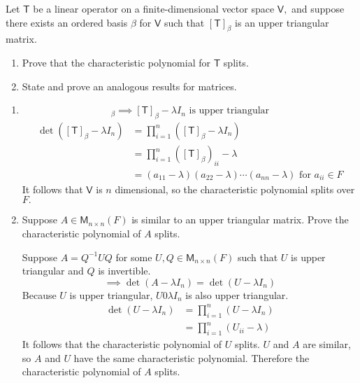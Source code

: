 Let $\mathsf{T}$ be a linear operator on a finite-dimensional vector
space $\mathsf{V},$ and suppose there exists an ordered basis $\beta$
for $\mathsf{V}$ such that $[\mathsf{T}]_\beta$ is an upper triangular
matrix.
\begin{enumerate}
\item Prove that the characteristic polynomial for $\mathsf{T}$
  splits.
\item State and prove an analogous results for matrices.
\end{enumerate}
\begin{enumerate}
\item
\begin{equation}
[\mathsf{T}]_\beta \implies [\mathsf{T}]_\beta -\lambda I_n \text{ is
  upper triangular}
\end{equation}
\begin{align}
\det{([\mathsf{T}]_\beta -\lambda I_n)} &= \prod\limits_{i=1}^n
([\mathsf{T}]_\beta -\lambda I_n) \\
&= \prod\limits_{i=1}^n([\mathsf{T}]_\beta)_{ii} -\lambda\\
&= (a_{11}-\lambda)(a_{22}-\lambda)\dotsb(a_{nn}-\lambda) \text{ for }
a_{ii} \in F
\end{align}
It follows that $\mathsf{V}$ is $n$ dimensional, so the characteristic
polynomial splits over $F.$
\item 
Suppose $A\in \mathsf{M}_{n \times n}(F)$ is similar to an upper
triangular matrix. Prove the characteristic polynomial of $A$ splits.

Suppose $A = Q^{-1}UQ$ for some $U,Q \in \mathsf{M}_{n \times n}(F)$
such that $U$ is upper triangular and $Q$ is invertible. 
\begin{equation}
\implies \det{(A-\lambda I_n)} = \det{(U-\lambda I_n)}
\end{equation}
Because $U$ is upper triangular, $U0\lambda I_n$ is also upper
triangular.
\begin{align}
\det{(U-\lambda I_n)} &= \prod\limits^n_{i=1} (U-\lambda I_n)\\
&=\prod\limits^n_{i=1} (U_{ii} -\lambda)
\end{align}
It follows that the characteristic polynomial of $U$ splits. $U$ and
$A$ are similar, so $A$ and $U$ have the same characteristic
polynomial. Therefore the characteristic polynomial of $A$ splits.
\end{enumerate}
